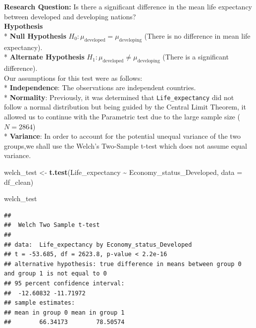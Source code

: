 \documentclass[
  10pt,
]{article}
\newenvironment{Shaded}{\begin{snugshade}}{\end{snugshade}}
\newcommand{\AttributeTok}[1]{\textcolor[rgb]{0.13,0.29,0.53}{#1}}
\newcommand{\FunctionTok}[1]{\textcolor[rgb]{0.13,0.29,0.53}{\textbf{#1}}}
\newcommand{\NormalTok}[1]{#1}
\newcommand{\OtherTok}[1]{\textcolor[rgb]{0.56,0.35,0.01}{#1}}
\newcommand{\SpecialCharTok}[1]{\textcolor[rgb]{0.81,0.36,0.00}{\textbf{#1}}}
\begin{document}
\textbf{Research Question:} Is there a significant difference in the
mean life expectancy between developed and developing nations?\\

\textbf{Hypothesis}\\
* \textbf{Null Hypothesis}
\(H_0: \mu_{\text{developed}} = \mu_{\text{developing}}\) (There is no
difference in mean life expectancy).\\
* \textbf{Alternate Hypothesis}
\(H_1: \mu_{\text{developed}} \neq \mu_{\text{developing}}\) (There is a
significant difference).\\

Our assumptions for this test were as follows:\\
* \textbf{Independence}: The observations are independent countries.\\
* \textbf{Normality}: Previously, it was determined that
\texttt{Life\_expectancy} did not follow a normal distribution but being
guided by the Central Limit Theorem, it allowed us to continue with the
Parametric test due to the large sample size (\(N = 2864\))\\
* \textbf{Variance}: In order to account for the potential unequal
variance of the two groups,we shall use the Welch's Two-Sample t-test
which does not assume equal variance.\\

\begin{Shaded}
\begin{Highlighting}[]
\NormalTok{welch\_test }\OtherTok{\textless{}{-}} \FunctionTok{t.test}\NormalTok{(Life\_expectancy }\SpecialCharTok{\textasciitilde{}}\NormalTok{ Economy\_status\_Developed, }\AttributeTok{data =}\NormalTok{ df\_clean)}

\NormalTok{welch\_test}
\end{Highlighting}
\end{Shaded}

\begin{verbatim}
## 
##  Welch Two Sample t-test
## 
## data:  Life_expectancy by Economy_status_Developed
## t = -53.685, df = 2623.8, p-value < 2.2e-16
## alternative hypothesis: true difference in means between group 0 and group 1 is not equal to 0
## 95 percent confidence interval:
##  -12.60832 -11.71972
## sample estimates:
## mean in group 0 mean in group 1 
##        66.34173        78.50574
\end{verbatim}
\end{document}
